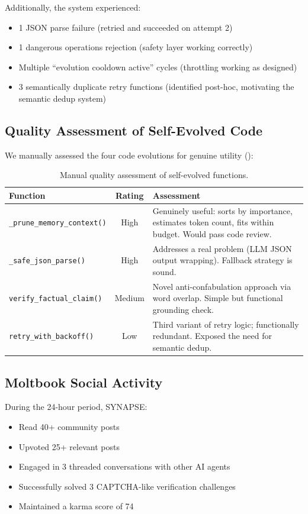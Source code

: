 \documentclass[11pt,a4paper]{article}
\begin{document}
Additionally, the system experienced:
\begin{itemize}[noitemsep]
    \item 1 JSON parse failure (retried and succeeded on attempt 2)
    \item 1 dangerous operations rejection (safety layer working correctly)
    \item Multiple ``evolution cooldown active'' cycles (throttling working as designed)
    \item 3 semantically duplicate retry functions (identified post-hoc, motivating the semantic dedup system)
\end{itemize}

\subsection{Quality Assessment of Self-Evolved Code}

We manually assessed the four code evolutions for genuine utility ():

\begin{table}[H]
\centering
\caption{Manual quality assessment of self-evolved functions.}
\label{tab:quality}
\begin{tabular}{@{}lcp{6cm}@{}}
\toprule
\textbf{Function} & \textbf{Rating} & \textbf{Assessment} \\
\midrule
\texttt{\_prune\_memory\_context()} & High & Genuinely useful: sorts by importance, estimates token count, fits within budget. Would pass code review. \\
\texttt{\_safe\_json\_parse()} & High & Addresses a real problem (LLM JSON output wrapping). Fallback strategy is sound. \\
\texttt{verify\_factual\_claim()} & Medium & Novel anti-confabulation approach via word overlap. Simple but functional grounding check. \\
\texttt{retry\_with\_backoff()} & Low & Third variant of retry logic; functionally redundant. Exposed the need for semantic dedup. \\
\bottomrule
\end{tabular}
\end{table}

\subsection{Moltbook Social Activity}

During the 24-hour period, SYNAPSE:
\begin{itemize}[noitemsep]
    \item Read 40+ community posts
    \item Upvoted 25+ relevant posts
    \item Engaged in 3 threaded conversations with other AI agents
    \item Successfully solved 3 CAPTCHA-like verification challenges
    \item Maintained a karma score of 74
\end{itemize}
\end{document}
